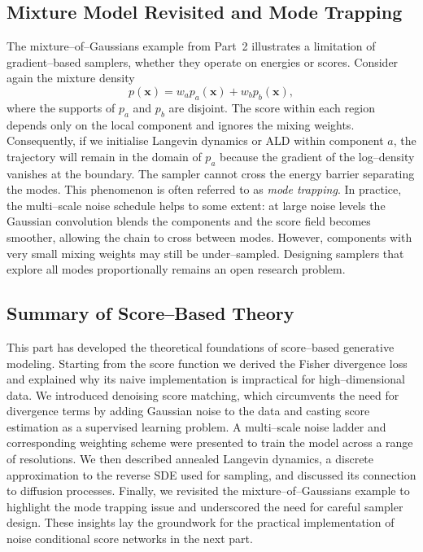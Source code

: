 \subsection{Mixture Model Revisited and Mode Trapping}

The mixture–of–Gaussians example from Part~2 illustrates a limitation of
gradient–based samplers, whether they operate on energies or scores.
Consider again the mixture density
\begin{equation}
    p(\mathbf{x}) = w_a p_a(\mathbf{x}) + w_b p_b(\mathbf{x}),
\end{equation}
where the supports of $p_a$ and $p_b$ are disjoint.  The score within
each region depends only on the local component and ignores the mixing
weights.  Consequently, if we initialise Langevin dynamics or ALD within
component $a$, the trajectory will remain in the domain of $p_a$ because
the gradient of the log–density vanishes at the boundary.  The sampler
cannot cross the energy barrier separating the modes.  This phenomenon is
often referred to as \emph{mode trapping}.  In practice, the multi–scale
noise schedule helps to some extent: at large noise levels the Gaussian
convolution blends the components and the score field becomes smoother,
allowing the chain to cross between modes.  However, components with very
small mixing weights may still be under–sampled.  Designing samplers that
explore all modes proportionally remains an open research problem.

\subsection{Summary of Score–Based Theory}

This part has developed the theoretical foundations of score–based
generative modeling.  Starting from the score function we derived the
Fisher divergence loss and explained why its naive implementation is
impractical for high–dimensional data.  We introduced denoising score
matching, which circumvents the need for divergence terms by adding
Gaussian noise to the data and casting score estimation as a supervised
learning problem.  A multi–scale noise ladder and corresponding
weighting scheme were presented to train the model across a range of
resolutions.  We then described annealed Langevin dynamics, a discrete
approximation to the reverse SDE used for sampling, and discussed its
connection to diffusion processes.  Finally, we revisited the
mixture–of–Gaussians example to highlight the mode trapping issue and
underscored the need for careful sampler design.  These insights lay the
groundwork for the practical implementation of noise conditional score
networks in the next part.

